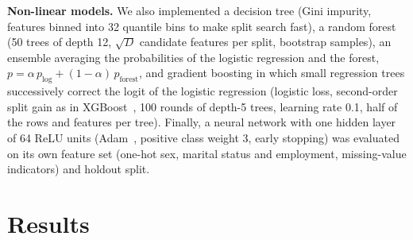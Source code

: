 \documentclass[10pt,conference,compsocconf,onecolumn]{IEEEtran}
\begin{document}
\textbf{Non-linear models.} We also implemented a decision tree (Gini impurity, features binned into
32 quantile bins to make split search fast), a random forest (50 trees of
depth 12, $\sqrt{D}$ candidate features per split, bootstrap samples), an
ensemble averaging the probabilities of the logistic regression and the
forest, $p = \alpha\, p_{\text{log}} + (1-\alpha)\, p_{\text{forest}}$, and
gradient boosting in which small regression trees successively correct the
logit of the logistic regression (logistic loss, second-order split gain as
in XGBoost~\cite{xgboost}, 100 rounds of depth-5 trees, learning rate 0.1,
half of the rows and features per tree). Finally, a neural network with
one hidden layer of 64 ReLU units (Adam~\cite{adam}, positive class weight 3,
early stopping) was evaluated on its own feature set (one-hot sex, marital
status and employment, missing-value indicators) and holdout split.

\section{Results}
\label{sec:results}
\end{document}
